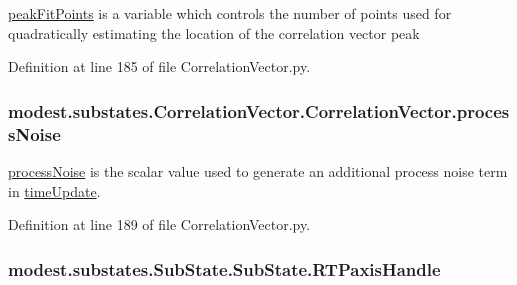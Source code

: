 \hyperlink{classmodest_1_1substates_1_1CorrelationVector_1_1CorrelationVector_a3a6c344370944a5e84a064cd26d1db81}{peak\+Fit\+Points} is a variable which controls the number of points used for quadratically estimating the location of the correlation vector peak 



Definition at line 185 of file Correlation\+Vector.\+py.

\subsubsection[{\texorpdfstring{process\+Noise}{processNoise}}]{\setlength{\rightskip}{0pt plus 5cm}modest.\+substates.\+Correlation\+Vector.\+Correlation\+Vector.\+process\+Noise}\hypertarget{classmodest_1_1substates_1_1CorrelationVector_1_1CorrelationVector_a975d7f4a8ff295bad20c31dee8fe0370}{}\label{classmodest_1_1substates_1_1CorrelationVector_1_1CorrelationVector_a975d7f4a8ff295bad20c31dee8fe0370}


\hyperlink{classmodest_1_1substates_1_1CorrelationVector_1_1CorrelationVector_a975d7f4a8ff295bad20c31dee8fe0370}{process\+Noise} is the scalar value used to generate an additional process noise term in \hyperlink{classmodest_1_1substates_1_1CorrelationVector_1_1CorrelationVector_a5eb64d242f27e54ed924a957238376b9}{time\+Update}. 



Definition at line 189 of file Correlation\+Vector.\+py.

\subsubsection[{\texorpdfstring{R\+T\+Paxis\+Handle}{RTPaxisHandle}}]{\setlength{\rightskip}{0pt plus 5cm}modest.\+substates.\+Sub\+State.\+Sub\+State.\+R\+T\+Paxis\+Handle\hspace{0.3cm}{\ttfamily [inherited]}}\hypertarget{classmodest_1_1substates_1_1SubState_1_1SubState_a914ef37afe2f8ab5c2ee9a6f4d898553}{}\label{classmodest_1_1substates_1_1SubState_1_1SubState_a914ef37afe2f8ab5c2ee9a6f4d898553}


